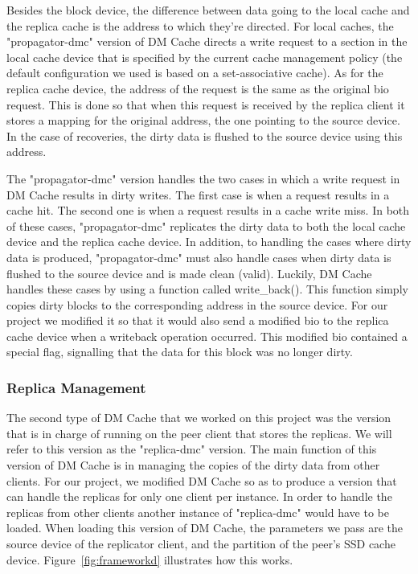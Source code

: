 Besides the block device, the difference between data going to 
the local cache and the replica cache is the address to which
they're directed. For local caches, the "propagator-dmc" version
of DM Cache directs a write request to a section in the local
cache device that is specified by the current cache management
policy (the default configuration we used is based on a 
set-associative cache). As for the replica cache device, the 
address of the request is the same as the original bio request. 
This is done so that when this request is received by the 
replica client it stores a mapping for the original address,
the one pointing to the source device. In the case of
recoveries, the dirty data is flushed to the source device
using this address.

The "propagator-dmc" version handles the two cases in which
a write request in DM Cache results in dirty writes. The first 
case is when a request results in a cache hit. The second one
is when a request results in a cache write miss. In both of these
cases, "propagator-dmc" replicates the dirty data to both 
the local cache device and the replica cache device. In addition,
to handling the cases where dirty data is produced, 
"propagator-dmc" must also handle cases when dirty data is flushed
to the source device and is made clean (valid). Luckily, DM Cache
handles these cases by using a function called write\_back(). 
This function simply copies dirty blocks to the corresponding
address in the source device. For our project we modified it
so that it would also send a modified bio to the replica cache
device when a writeback operation occurred. This modified bio 
contained a special flag, signalling that the data for this 
block was no longer dirty.


\subsubsection{Replica Management}

The second type of DM Cache that we worked on this project
was the version that is in charge of running on the peer 
client that stores the replicas. We will refer to this version
as the "replica-dmc" version. The main function of this
version of DM Cache is in managing the copies of the dirty
data from other clients. For our project, we modified DM Cache
so as to produce a version that can handle the replicas for
only one client per instance.  In order to handle the replicas 
from other clients another instance of "replica-dmc" would have 
to be loaded. When loading this version of DM Cache, the 
parameters we pass are the source device of the replicator 
client, and the partition of the peer's SSD cache device.
Figure~\ref{fig:frameworkd} illustrates how this works.

